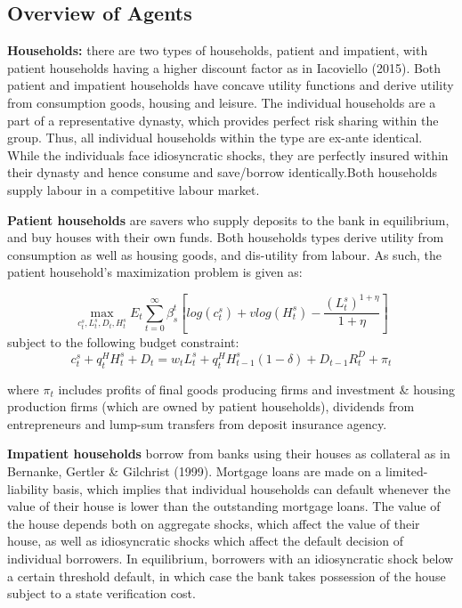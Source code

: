 \documentclass[12pt]{article}
\numberwithin{equation}{section}
\begin{document}
\subsection{Overview of Agents}

\noindent
\textbf{Households:} there are two types of households, patient and impatient, with patient households having a higher discount factor as in Iacoviello (2015). Both patient and impatient households have concave utility functions and derive utility from consumption goods, housing and leisure. The individual households are a part of a representative dynasty, which provides perfect risk sharing within the group. Thus, all individual households within the type are ex-ante identical. While the individuals face idiosyncratic shocks, they are perfectly insured within their dynasty and hence consume and save/borrow identically.Both households supply labour in a competitive labour market.

\noindent
\textbf{Patient households} are savers who supply deposits to the bank in equilibrium, and buy houses with their own funds. Both households types derive utility from consumption as well as housing goods, and dis-utility from labour. As such, the patient household's maximization problem is given as:

\begin{equation}
\max_{c^s_t,L^s_t,D_{t},H^s_t}E_t\sum _{t=0}^{\infty } \beta_{s}^t [log(c^s_t)+vlog(H^s_t)-\frac{(L^s_t)^{1+\eta}}{1+\eta} ]
\end{equation}
subject to the following budget constraint: 
\begin{equation}
c^s_t+q^H_{t}H^s_{t} +{D_{t}}=w_{t}L^s_{t}+q^H_{t}H^s_{t-1}(1-\delta)+{D_{t-1}}R^D_{t}+\pi_{t}
\end{equation}

where $\pi_{t}$ includes profits of final goods producing firms and investment \& housing production firms (which are owned by patient households), dividends from entrepreneurs and lump-sum transfers from deposit insurance agency. 



\noindent
\textbf{Impatient households} borrow from banks using their houses as collateral as in Bernanke, Gertler \& Gilchrist (1999). Mortgage loans are made on a limited-liability basis, which implies that individual households can default whenever the value of their house is lower than the outstanding mortgage loans. The value of the house depends both on aggregate shocks, which affect the value of their house, as well as idiosyncratic shocks which affect the default decision of individual borrowers. In equilibrium, borrowers with an idiosyncratic shock below a certain threshold default, in which case the bank takes possession of the house subject to a state verification cost.
\end{document}
